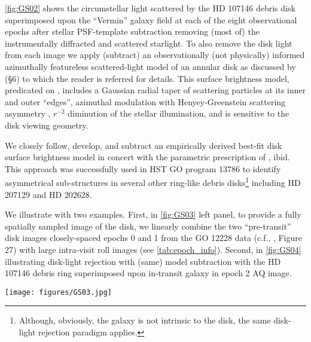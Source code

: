 \documentclass{aa}
\begin{document}
\autoref{fig:GS02} shows the circumstellar light scattered by the HD 107146 debris disk superimposed upon  the “Vermin” galaxy field at each of the eight observational epochs after stellar PSF-template subtraction removing (most of) the instrumentally diffracted and scattered starlight. To also remove the disk light from each image we apply (subtract) an observationally (not physically) informed azimuthally featureless scattered-light model of an annular disk as discussed by \cite{schneider2016extinction} (§6) to which the reader is referred for details. This surface brightness model, predicated on \cite{schneider2006discovery}, includes a Gaussian radial taper of scattering particles at its inner and outer “edges”, azimuthal modulation with Henyey-Greenstein scattering asymmetry \citep{henyey1941diffuse}, $r^{-2}$ diminution of the stellar illumination, and is sensitive to the disk viewing geometry.

We closely follow, develop, and subtract an empirically derived best-fit disk surface brightness model in concert with the parametric prescription of \cite{schneider2016extinction}, ibid. This approach was successfully used in HST GO program 13786 to identify asymmetrical sub-structures in several other ring-like debris disks\footnote{Although, obviously, the galaxy is not intrinsic to the disk, the same disk-light rejection paradigm applies.} including HD 207129 and HD 202628. 

We illustrate with two examples. First, in \autoref{fig:GS03} left panel, to provide a fully spatially sampled image of the disk, we linearly combine the two “pre-transit” disk images closely-spaced epochs 0 and 1 from the GO 12228 data (c.f., \cite{schneider2014probing}, Figure 27) with large intra-visit roll images (see \autoref{tab:epoch_info}). Second, in \autoref{fig:GS04} illustrating disk-light rejection with (same) model subtraction with the HD 107146 debris ring superimposed upon in-transit galaxy in epoch 2 AQ image.

\begin{figure*}[ht]
    \centering
    \texttt{[image: figures/GS03.jpg]}
    \caption{Left: Epoch 0+1 AQ image of the HD 107146 debris ring fully sampled with the Vermin galaxy well separated beyond the periphery of the disk. Linear display range $\pm 0.05$ counts per second per pixel to show the structure of remaining PSF-subtraction residuals without saturating at the radius of highest surface brightness while also revealing the low level of ``pixel to pixel'' noise in the sky background at the field boundaries.  Middle: Model disk image at same display stretch derived from all eight epochs with galaxy masked. Right: Representative surface brightness radial profile/cross-section (arbitrarily along disk major axis) comparison of AQ image (solid line) vs. model comparison (dot-dashed line) showing excellent agreement at $r > 65$ pixels ($3.3''$) in region of interest of galaxy reflex motion at epochs 0 – 7 inclusive.}
    \label{fig:GS03}
\end{figure*}
\end{document}
